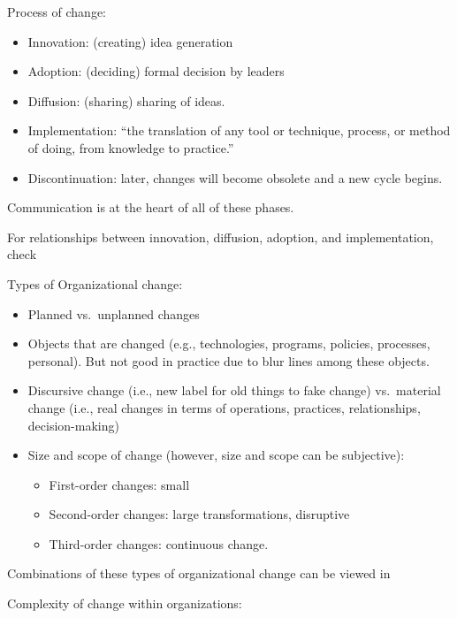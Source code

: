 \documentclass[
]{book}
\providecommand{\tightlist}{%
  \setlength{\itemsep}{0pt}\setlength{\parskip}{0pt}}
\begin{document}
Process of change:

\begin{itemize}
\tightlist
\item
  Innovation: (creating) idea generation
\item
  Adoption: (deciding) formal decision by leaders
\item
  Diffusion: (sharing) sharing of ideas.
\item
  Implementation: ``the translation of any tool or technique, process, or method of doing, from knowledge to practice.''
  \citep{Tornatzky_1982}
\item
  Discontinuation: later, changes will become obsolete and a new cycle begins.
\end{itemize}

Communication is at the heart of all of these phases.

For relationships between innovation, diffusion, adoption, and implementation, check \citep[pp.~35]{Lewis_2019}

Types of Organizational change:

\begin{itemize}
\item
  Planned vs.~unplanned changes
\item
  Objects that are changed (e.g., technologies, programs, policies, processes, personal). But not good in practice due
  to blur lines among these objects.
\item
  Discursive change (i.e., new label for old things to fake change) vs.~material change (i.e., real changes in terms
  of operations, practices, relationships, decision-making) \citep[pp.10]{Zorn_1999}
\item
  Size and scope of change \citep{Bartunek_1987} (however, size and scope can be subjective):

  \begin{itemize}
  \item
    First-order changes: small
  \item
    Second-order changes: large transformations, disruptive
  \item
    Third-order changes: continuous change.
  \end{itemize}
\end{itemize}

Combinations of these types of organizational change can be viewed in \citep[pp.~42]{Lewis_2019}

Complexity of change within organizations:
\end{document}
